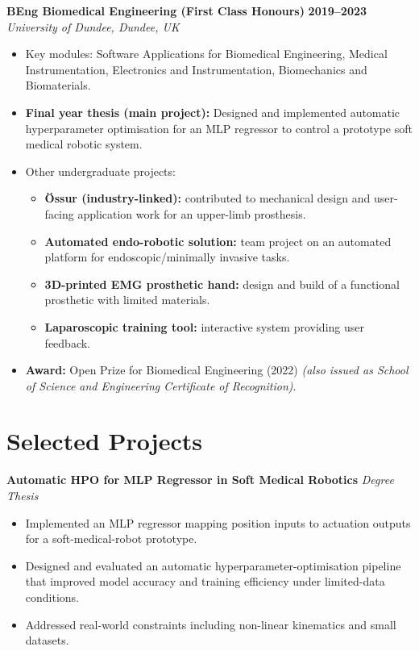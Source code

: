 \documentclass[a4paper,11pt]{article}
\begin{document}
\textbf{BEng Biomedical Engineering (First Class Honours)} \hfill \textbf{2019--2023}\\
\textit{University of Dundee, Dundee, UK}
\begin{itemize}
    \item Key modules: Software Applications for Biomedical Engineering, Medical Instrumentation, Electronics and Instrumentation, Biomechanics and Biomaterials.
    \item \textbf{Final year thesis (main project):} Designed and implemented automatic hyperparameter optimisation for an MLP regressor to control a prototype soft medical robotic system.
    \item Other undergraduate projects:
    \begin{itemize}
        \item \textbf{Össur (industry-linked):} contributed to mechanical design and user-facing application work for an upper-limb prosthesis.
        \item \textbf{Automated endo-robotic solution:} team project on an automated platform for endoscopic/minimally invasive tasks.
        \item \textbf{3D-printed EMG prosthetic hand:} design and build of a functional prosthetic with limited materials.
        \item \textbf{Laparoscopic training tool:} interactive system providing user feedback.
    \end{itemize}
    \item \textbf{Award:} Open Prize for Biomedical Engineering (2022) \emph{(also issued as School of Science and Engineering Certificate of Recognition)}.
\end{itemize}


\section*{Selected Projects}

\textbf{Automatic HPO for MLP Regressor in Soft Medical Robotics} \hfill \textit{Degree Thesis}
\begin{itemize}
    \item Implemented an MLP regressor mapping position inputs to actuation outputs for a soft-medical-robot prototype.
    \item Designed and evaluated an automatic hyperparameter-optimisation pipeline that improved model accuracy and training efficiency under limited-data conditions.
    \item Addressed real-world constraints including non-linear kinematics and small datasets.
\end{itemize}
\end{document}
